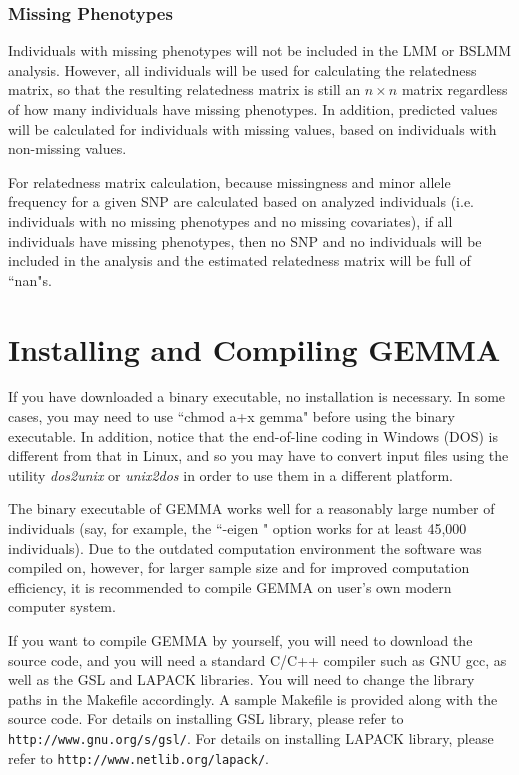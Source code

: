 \documentclass[11pt]{article}
\providecommand{\url}[1]{\texttt{#1}}
\begin{document}
\subsubsection{Missing Phenotypes}
Individuals with missing phenotypes will not be included in the LMM or BSLMM analysis. However, all individuals will be used for calculating the relatedness matrix, so that the resulting relatedness matrix is still an $n\times n$ matrix regardless of how many individuals have missing phenotypes. In addition, predicted values will be calculated for individuals with missing values, based on individuals with non-missing values.

For relatedness matrix calculation, because missingness and minor allele frequency for a given SNP are calculated based on analyzed individuals (i.e. individuals with no missing phenotypes and no missing covariates), if all individuals have missing phenotypes, then no SNP and no individuals will be included in the analysis and the estimated relatedness matrix will be full of ``nan"s.

\newpage
\section{Installing and Compiling GEMMA}
If you have downloaded a binary executable, no installation is necessary. In some cases, you may need to use ``chmod a+x gemma" before using the binary executable. In addition, notice that the end-of-line coding in Windows (DOS) is different from that in Linux, and so you may have to convert input files using the utility {\it dos2unix} or {\it unix2dos} in order to use them in a different platform. 

The binary executable of GEMMA works well for a reasonably large number of individuals (say, for example, the ``-eigen " option works for at least 45,000 individuals). Due to the outdated computation environment the software was compiled on, however, for larger sample size and for improved computation efficiency, it is recommended to compile GEMMA on user's own modern computer system. 

If you want to compile GEMMA by yourself, you will need to download the source code, and you will need a standard C/C++ compiler such as GNU gcc, as well as the GSL and LAPACK libraries. You will need to change the library paths in the Makefile accordingly. A sample Makefile is provided along with the source code. For details on installing GSL library, please refer to \url{http://www.gnu.org/s/gsl/}. For details on installing LAPACK library, please refer to \url{http://www.netlib.org/lapack/}.
\end{document}
